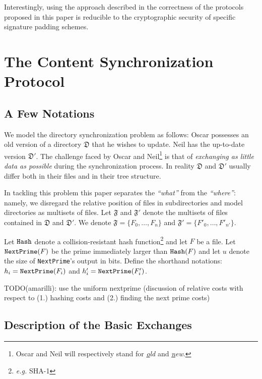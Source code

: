 \documentclass[11pt]{llncs}
\begin{document}
Interestingly, using the approach described in \cite{comparing} the correctness of the protocols proposed in this paper is reducible to the cryptographic security of specific signature padding schemes.

\section{The Content Synchronization Protocol}

\subsection{A Few Notations}

We model the directory synchronization problem as follows: Oscar possesses an old version of a directory $\mathfrak{D}$ that he wishes to update. Neil has the up-to-date version $\mathfrak{D}'$. The challenge faced by Oscar and Neil\footnote{Oscar and Neil will respectively stand for {\sl \underline{o}ld} and {\sl \underline{n}ew}.} is that of {\sl exchanging as little data as possible} during the synchronization process. In reality $\mathfrak{D}$ and $\mathfrak{D}'$ usually differ both in their files and in their tree structure.\smallskip

In tackling this problem this paper separates the {\sl ``what''} from the {\sl ``where''}: namely, we disregard the relative position of files in subdirectories and model directories as multisets of files. Let $\mathfrak{F}$ and $\mathfrak{F}'$ denote the multisets of files contained in $\mathfrak{D}$ and $\mathfrak{D}'$. We denote $\mathfrak{F}=\{F_0,\ldots,F_{n}\}$ and $\mathfrak{F}'=\{F'_0,\ldots,F'_{n'}\}$.\smallskip

Let $\mbox{{\tt Hash}}$ denote a collision-resistant hash function\footnote{{\sl e.g.} SHA-1} and let $F$ be a file. Let $\mbox{{\tt NextPrime}}(F)$ be the prime immediately larger than $\mbox{{\tt Hash}}(F)$ and let $u$ denote the size of {\tt NextPrime}'s output in bits. Define the shorthand notations: $h_i=\mbox{{\tt NextPrime}}(F_i)$ and $h'_i=\mbox{{\tt NextPrime}}(F'_i)$.\smallskip

TODO(amarilli): use the uniform nextprime (discussion of relative costs with respect to (1.) hashing costs and (2.) finding the next prime costs)

\subsection{Description of the Basic Exchanges}
\label{basic}
\end{document}
